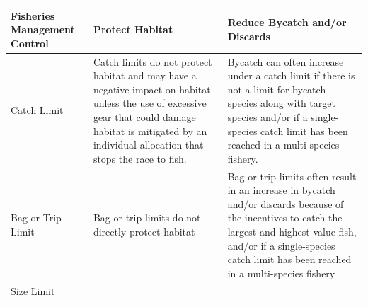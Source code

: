 \documentclass[]{book}
\begin{document}
\begin{longtable}[]{@{}lll@{}}
\toprule
\begin{minipage}[b]{0.30\columnwidth}\raggedright\strut
\textbf{Fisheries Management Control}\strut
\end{minipage} & \begin{minipage}[b]{0.30\columnwidth}\raggedright\strut
\textbf{Protect Habitat}\strut
\end{minipage} & \begin{minipage}[b]{0.30\columnwidth}\raggedright\strut
\textbf{Reduce Bycatch and/or Discards}\strut
\end{minipage}\tabularnewline
\midrule
\endhead
\begin{minipage}[t]{0.30\columnwidth}\raggedright\strut
Catch Limit\strut
\end{minipage} & \begin{minipage}[t]{0.30\columnwidth}\raggedright\strut
Catch limits do not protect habitat and may have a negative impact on
habitat unless the use of excessive gear that could damage habitat is
mitigated by an individual allocation that stops the race to fish.\strut
\end{minipage} & \begin{minipage}[t]{0.30\columnwidth}\raggedright\strut
Bycatch can often increase under a catch limit if there is not a limit
for bycatch species along with target species and/or if a single-species
catch limit has been reached in a multi-species fishery.\strut
\end{minipage}\tabularnewline
\begin{minipage}[t]{0.30\columnwidth}\raggedright\strut
Bag or Trip Limit\strut
\end{minipage} & \begin{minipage}[t]{0.30\columnwidth}\raggedright\strut
Bag or trip limits do not directly protect habitat\strut
\end{minipage} & \begin{minipage}[t]{0.30\columnwidth}\raggedright\strut
Bag or trip limits often result in an increase in bycatch and/or
discards because of the incentives to catch the largest and highest
value fish, and/or if a single-species catch limit has been reached in a
multi-species fishery\strut
\end{minipage}\tabularnewline
\begin{minipage}[t]{0.30\columnwidth}\raggedright\strut
Size Limit\strut
\end{minipage} & \begin{minipage}[t]{0.30\columnwidth}\raggedright\strut

\end{minipage}
\end{longtable}
\end{document}
